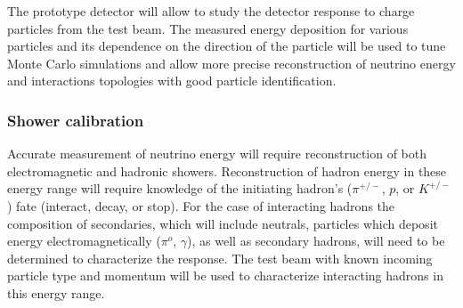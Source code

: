 The prototype detector will allow to study the detector response to charge particles from the test beam. The measured energy deposition for various particles and its dependence on the direction of the particle will be used to tune
Monte Carlo simulations and allow more precise reconstruction of neutrino energy and interactions topologies with good particle identification.


\subsubsection{Shower calibration}
\label{sec:showers}

Accurate measurement of neutrino energy will require reconstruction of both electromagnetic and hadronic showers. Reconstruction of hadron energy 
in these energy range will require knowledge of the initiating hadron's 
($\pi^{+/-}$, $p$, or $K^{+/-}$)
fate (interact, decay, or stop). For the case of  interacting hadrons 
the composition of secondaries, which will include neutrals, particles which 
deposit energy electromagnetically ($\pi^o$, $\gamma$), as well as 
secondary hadrons,
will need to be determined to characterize the response. 
The test beam with known incoming particle type and momentum will be used
to characterize interacting hadrons in this energy range.

